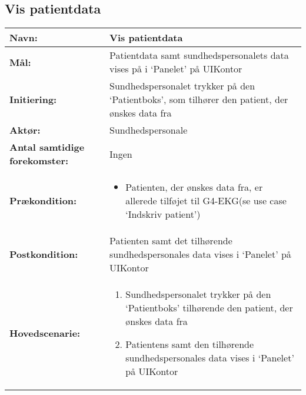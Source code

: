 \subsection{Vis patientdata}
\begin{table}[H]
\begin{tabular}{|l|p{10cm}|}
\hline
\textbf{Navn:} & \textbf{Vis patientdata}\\\hline
\textbf{Mål:} & Patientdata samt sundhedspersonalets data vises på i ‘Panelet’ på UIKontor \\\hline
\textbf{Initiering:} & Sundhedspersonalet trykker på den ‘Patientboks’, som tilhører den patient, der ønskes data fra \\\hline
\textbf{Aktør:} & Sundhedspersonale \\\hline
\textbf{Antal samtidige forekomster:} & Ingen \\\hline
\textbf{Prækondition:} & \begin{itemize}[label=$\circ$]
\item{Patienten, der ønskes data fra, er allerede tilføjet til G4-EKG(se use case ‘Indskriv patient’)}
\end{itemize}
\\\hline
\textbf{Postkondition:} & Patienten samt det tilhørende sundhedspersonales data vises i ‘Panelet’ på UIKontor \\\hline
\textbf{Hovedscenarie:} &
\begin{enumerate}
\item{Sundhedspersonalet trykker på den ‘Patientboks’ tilhørende den patient, der ønskes data fra }
\item{Patientens samt den tilhørende sundhedspersonales data vises i ‘Panelet’ på UIKontor}
\end{enumerate}\\\hline
\end{tabular}
\end{table}
\newpage

